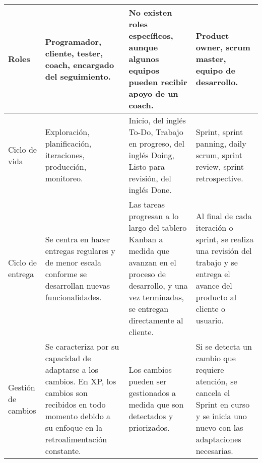 \begin{longtable}{|p{2.5cm}|p{3cm}|p{3cm}|p{3cm}|}
    Roles                                          & Programador, cliente, tester, coach, encargado del seguimiento.                                                                                                     & No existen roles específicos, aunque algunos equipos pueden recibir apoyo de un coach.                                                                                                  & Product owner, scrum master, equipo de desarrollo.                                                                                                                                   \\ \hline
    Ciclo de vida                                  & Exploración, planificación, iteraciones, producción, monitoreo.                                                                                                     & Inicio, del inglés To-Do, Trabajo en progreso, del inglés Doing, Listo para revisión, del inglés Done.                                                                                  & Sprint, sprint panning, daily scrum, sprint review, sprint retrospective.                                                                                                            \\ \hline
    Ciclo de entrega                               & Se centra en hacer entregas regulares y de menor escala conforme se desarrollan nuevas funcionalidades.                                                             & Las tareas progresan a lo largo del tablero Kanban a medida que avanzan en el proceso de desarrollo, y una vez terminadas, se entregan directamente al cliente.                         & Al final de cada iteración o sprint, se realiza una revisión del trabajo y se entrega el avance del producto al cliente o usuario.                                                   \\ \hline
    Gestión de cambios                             & Se caracteriza por su capacidad de adaptarse a los cambios. En XP, los cambios son recibidos en todo momento debido a su enfoque en la retroalimentación constante. & Los cambios pueden ser gestionados a medida que son detectados y priorizados.                                                                                                           & Si se detecta un cambio que requiere atención, se cancela el Sprint en curso y se inicia uno nuevo con las adaptaciones necesarias.                                                  \\ \hline

\end{longtable}
